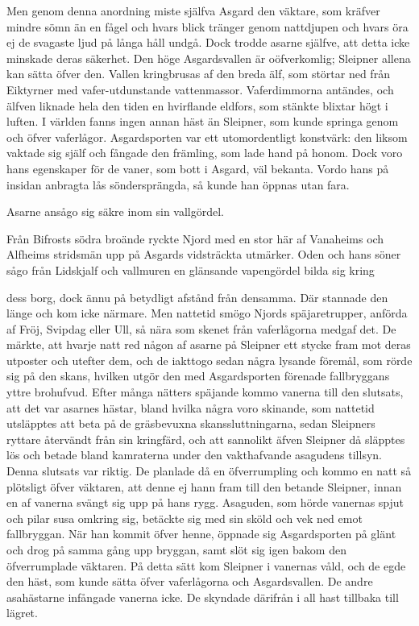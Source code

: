 Men genom denna anordning miste själfva Asgard den väktare, som kräfver
mindre sömn än en fågel och hvars blick tränger genom nattdjupen och
hvars öra ej de svagaste ljud på långa håll undgå. Dock trodde asarne
själfve, att detta icke minskade deras säkerhet. Den höge Asgardsvallen
är oöfverkomlig; Sleipner allena kan sätta öfver den. Vallen kringbrusas
af den breda älf, som störtar ned från Eiktyrner med vafer-utdunstande
vattenmassor. Vaferdimmorna antändes, och älfven liknade hela den tiden
en hvirflande eldfors, som stänkte blixtar högt i luften. I världen
fanns ingen annan häst än Sleipner, som kunde springa genom och öfver
vaferlågor. Asgardsporten var ett utomordentligt konstvärk: den liksom
vaktade sig själf och fångade den främling, som lade hand på honom. Dock
voro hans egenskaper för de vaner, som bott i Asgard, väl bekanta. Vordo
hans på insidan anbragta lås söndersprängda, så kunde han öppnas utan
fara.

Asarne ansågo sig säkre inom sin vallgördel.

Från Bifrosts södra broände ryckte Njord med en stor här af Vanaheims
och Alfheims stridsmän upp på Asgards vidsträckta utmärker. Oden och
hans söner sågo från Lidskjalf och vallmuren en glänsande vapengördel
bilda sig kring

dess borg, dock ännu på betydligt afstånd från densamma. Där stannade
den länge och kom icke närmare. Men nattetid smögo Njords
späjaretrupper, anförda af Fröj, Svipdag eller Ull, så nära som skenet
från vaferlågorna medgaf det. De märkte, att hvarje natt red någon af
asarne på Sleipner ett stycke fram mot deras utposter och utefter dem,
och de iakttogo sedan några lysande föremål, som rörde sig på den skans,
hvilken utgör den med Asgardsporten förenade fallbryggans yttre
brohufvud. Efter många nätters späjande kommo vanerna till den slutsats,
att det var asarnes hästar, bland hvilka några voro skinande, som
nattetid utsläpptes att beta på de gräsbevuxna skanssluttningarna, sedan
Sleipners ryttare återvändt från sin kringfärd, och att sannolikt äfven
Sleipner då släpptes lös och betade bland kamraterna under den
vakthafvande asagudens tillsyn. Denna slutsats var riktig. De planlade
då en öfverrumpling och kommo en natt så plötsligt öfver väktaren, att
denne ej hann fram till den betande Sleipner, innan en af vanerna svängt
sig upp på hans rygg. Asaguden, som hörde vanernas spjut och pilar susa
omkring sig, betäckte sig med sin sköld och vek ned emot fallbryggan.
När han kommit öfver henne, öppnade sig Asgardsporten på glänt och drog
på samma gång upp bryggan, samt slöt sig igen bakom den öfverrumplade
väktaren. På detta sätt kom Sleipner i vanernas våld, och de egde den
häst, som kunde sätta öfver vaferlågorna och Asgardsvallen. De andre
asahästarne infångade vanerna icke. De skyndade därifrån i all hast
tillbaka till lägret.

